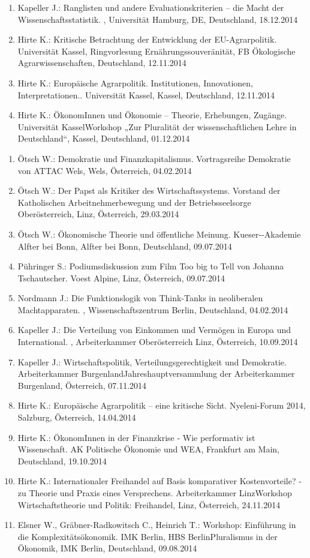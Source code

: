 \begin{enumerate}
	\item Kapeller J.: Ranglisten und andere Evaluationskriterien – die Macht der Wissenschaftsstatistik. , Universität Hamburg, DE, Deutschland, 18.12.2014
	\item Hirte K.: Kritische Betrachtung der Entwicklung der EU-Agrarpolitik. Universität Kassel, Ringvorlesung Ernährungssouveränität, FB Ökologische Agrarwissenschaften, Deutschland, 12.11.2014
	\item Hirte K.: Europäische Agrarpolitik. Institutionen, Innovationen, Interpretationen.. Universität Kassel, Kassel, Deutschland, 12.11.2014
	\item Hirte K.: ÖkonomInnen und Ökonomie – Theorie, Erhebungen, Zugänge. Universität KasselWorkshop „Zur Pluralität der wissenschaftlichen Lehre in Deutschland“, Kassel, Deutschland, 01.12.2014
\end{enumerate}

\begin{enumerate}
	\item Ötsch W.: Demokratie und Finanzkapitalismus. Vortragsreihe Demokratie von ATTAC Wels, Wels, Österreich, 04.02.2014
	\item Ötsch W.: Der Papst als Kritiker des Wirtschaftssystems. Vorstand der Katholischen Arbeitnehmerbewegung und der Betriebsseelsorge Oberösterreich, Linz, Österreich, 29.03.2014
	\item Ötsch W.: Ökonomische Theorie und öffentliche Meinung. Kueser-­‐Akademie Alfter bei Bonn, Alfter bei Bonn, Deutschland, 09.07.2014
	\item Pühringer S.: Podiumsdiskussion zum Film Too big to Tell von Johanna Tschautscher. Voest Alpine, Linz, Österreich, 09.07.2014
	\item Nordmann J.: Die Funktionslogik von Think-Tanks in neoliberalen Machtapparaten. , Wissenschaftszentrum Berlin, Deutschland, 04.02.2014
	\item Kapeller J.: Die Verteilung von Einkommen und Vermögen in Europa und International. , Arbeiterkammer Oberösterreich Linz, Österreich, 10.09.2014
	\item Kapeller J.: Wirtschaftspolitik, Verteilungsgerechtigkeit und Demokratie. Arbeiterkammer BurgenlandJahreshauptversammlung der Arbeiterkammer Burgenland, Österreich, 07.11.2014
	\item Hirte K.: Europäische Agrarpolitik – eine kritische Sicht. Nyeleni-Forum 2014, Salzburg, Österreich, 14.04.2014
	\item Hirte K.: ÖkonomInnen in der Finanzkrise - Wie performativ ist Wissenschaft. AK Politische Ökonomie und WEA, Frankfurt am Main, Deutschland, 19.10.2014
	\item Hirte K.: Internationaler Freihandel auf Basis komparativer Kostenvorteile? - zu Theorie und Praxis eines Versprechens. Arbeiterkammer LinzWorkshop Wirtschaftstheorie und Politik: Freihandel, Linz, Österreich, 24.11.2014
	\item Elsner W., Gräbner-Radkowitsch C., Heinrich T.: Workshop: Einführung in die Komplexitätsökonomik. IMK Berlin, HBS BerlinPluralismus in der Ökonomik, IMK Berlin, Deutschland, 09.08.2014
\end{enumerate}

